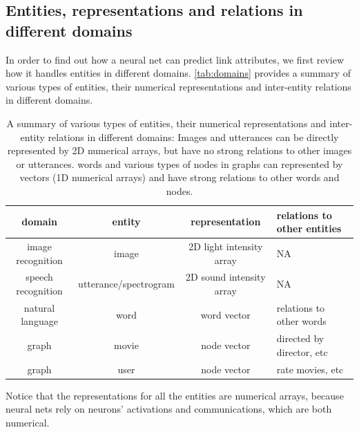 \documentclass{article}
\begin{document}
\subsection{Entities, representations and relations in different domains}
In order to find out how a neural net can predict link attributes, we first 
review how it handles entities in different domains.
\autoref{tab:domains} provides a summary of various types of entities, their 
numerical representations and inter-entity relations in different domains.
\begin{table}[h]
	\centering
	\begin{tabularx}{\textwidth}{ |c|c|c|X| } \hline
		domain & entity & representation & relations to other entities \\ \hline
		image recognition & image & 2D light intensity array & NA \\ \hline 
		speech recognition & utterance/spectrogram & 2D sound intensity array & 
		NA \\ \hline
		natural language & word & word vector & relations to other words \\ 
		\hline
		graph & movie & node vector & directed by director, etc \\ \hline
		graph & user & node vector & rate movies, etc \\ \hline
	\end{tabularx}
	\caption{A summary of various types of entities, their numerical
		representations and inter-entity relations in different domains:
		Images and utterances can be directly represented by 2D numerical 
		arrays, but have no strong relations to other images or utterances. 
		words and various types of nodes in graphs can represented by vectors 
		(1D numerical arrays) and have strong relations to other words and 
		nodes.}
	\label{tab:domains}
\end{table} 
Notice that the representations for all the entities are numerical arrays, 
because neural nets rely on neurons' activations and communications, which 
are both numerical.
\end{document}
